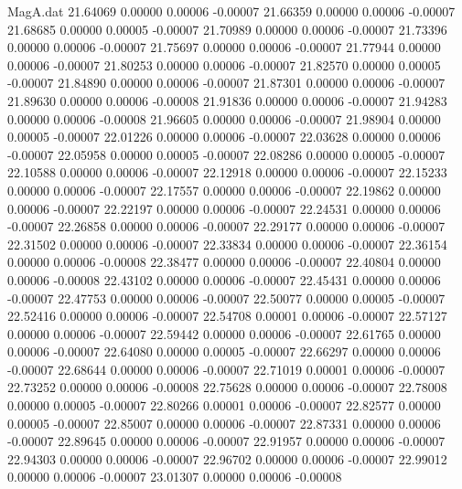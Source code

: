 \begin{filecontents}{MagA.dat}
  21.64069    0.00000    0.00006   -0.00007
  21.66359    0.00000    0.00006   -0.00007
  21.68685    0.00000    0.00005   -0.00007
  21.70989    0.00000    0.00006   -0.00007
  21.73396    0.00000    0.00006   -0.00007
  21.75697    0.00000    0.00006   -0.00007
  21.77944    0.00000    0.00006   -0.00007
  21.80253    0.00000    0.00006   -0.00007
  21.82570    0.00000    0.00005   -0.00007
  21.84890    0.00000    0.00006   -0.00007
  21.87301    0.00000    0.00006   -0.00007
  21.89630    0.00000    0.00006   -0.00008
  21.91836    0.00000    0.00006   -0.00007
  21.94283    0.00000    0.00006   -0.00008
  21.96605    0.00000    0.00006   -0.00007
  21.98904    0.00000    0.00005   -0.00007
  22.01226    0.00000    0.00006   -0.00007
  22.03628    0.00000    0.00006   -0.00007
  22.05958    0.00000    0.00005   -0.00007
  22.08286    0.00000    0.00005   -0.00007
  22.10588    0.00000    0.00006   -0.00007
  22.12918    0.00000    0.00006   -0.00007
  22.15233    0.00000    0.00006   -0.00007
  22.17557    0.00000    0.00006   -0.00007
  22.19862    0.00000    0.00006   -0.00007
  22.22197    0.00000    0.00006   -0.00007
  22.24531    0.00000    0.00006   -0.00007
  22.26858    0.00000    0.00006   -0.00007
  22.29177    0.00000    0.00006   -0.00007
  22.31502    0.00000    0.00006   -0.00007
  22.33834    0.00000    0.00006   -0.00007
  22.36154    0.00000    0.00006   -0.00008
  22.38477    0.00000    0.00006   -0.00007
  22.40804    0.00000    0.00006   -0.00008
  22.43102    0.00000    0.00006   -0.00007
  22.45431    0.00000    0.00006   -0.00007
  22.47753    0.00000    0.00006   -0.00007
  22.50077    0.00000    0.00005   -0.00007
  22.52416    0.00000    0.00006   -0.00007
  22.54708    0.00001    0.00006   -0.00007
  22.57127    0.00000    0.00006   -0.00007
  22.59442    0.00000    0.00006   -0.00007
  22.61765    0.00000    0.00006   -0.00007
  22.64080    0.00000    0.00005   -0.00007
  22.66297    0.00000    0.00006   -0.00007
  22.68644    0.00000    0.00006   -0.00007
  22.71019    0.00001    0.00006   -0.00007
  22.73252    0.00000    0.00006   -0.00008
  22.75628    0.00000    0.00006   -0.00007
  22.78008    0.00000    0.00005   -0.00007
  22.80266    0.00001    0.00006   -0.00007
  22.82577    0.00000    0.00005   -0.00007
  22.85007    0.00000    0.00006   -0.00007
  22.87331    0.00000    0.00006   -0.00007
  22.89645    0.00000    0.00006   -0.00007
  22.91957    0.00000    0.00006   -0.00007
  22.94303    0.00000    0.00006   -0.00007
  22.96702    0.00000    0.00006   -0.00007
  22.99012    0.00000    0.00006   -0.00007
  23.01307    0.00000    0.00006   -0.00008

\end{filecontents}
